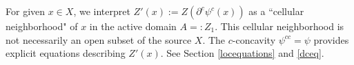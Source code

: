 \documentclass[12pt]{amsart}
\theoremstyle{definition}
\theoremstyle{remark}
\newcommand{\del}{\partial}
\begin{document}


For given $x\in X$, we interpret $Z'(x):=Z(\del^c \psi^c (x))$ as a ``cellular neighborhood" of $x$ in the active domain $A=:Z_1$. This cellular neighborhood is not necessarily an open subset of the source $X$. The $c$-concavity $\psi^{cc}=\psi$ provides explicit equations describing $Z'(x)$. See Section \ref{locequations} and \eqref{dceq}. 
















\end{document}
